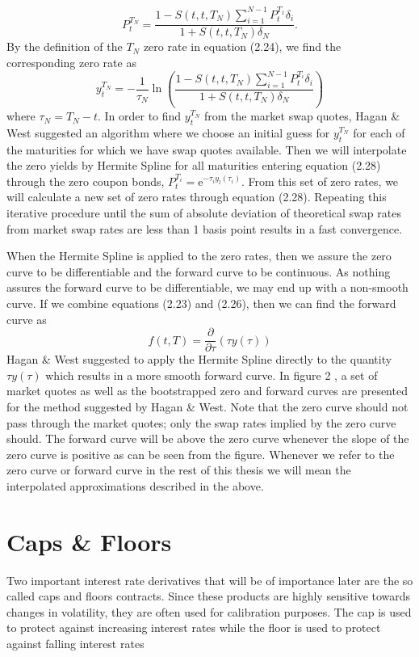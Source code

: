 \documentclass[12pt,twoside]{reedthesis}
\begin{document}
\[
P_{t}^{T_{N}}=\frac{1-S\left(t, t, T_{N}\right) \sum_{i=1}^{N-1} P_{t}^{T_{1}} \delta_{i}}{1+S\left(t, t, T_{N}\right) \delta_{N}} .
\]
By the definition of the \(T_{N}\) zero rate in equation (2.24), we find the corresponding zero rate as
\[
y_{t}^{T_{N}}=-\frac{1}{\tau_{N}} \ln \left(\frac{1-S\left(t, t, T_{N}\right) \sum_{i=1}^{N-1} P_{t}^{T_{i}} \delta_{i}}{1+S\left(t, t, T_{N}\right) \delta_{N}}\right)
\]
where \(\tau_{N}=T_{N}-t\). In order to find \(y_{t}^{T_{N}}\) from the market swap quotes, Hagan \& West suggested an algorithm where we choose an initial guess for \(y_{t}^{T_{N}}\) for each of the maturities for which we have swap quotes available. Then we will interpolate the zero yields by Hermite Spline for all maturities entering equation (2.28) through the zero coupon bonds, \(P_{t}^{T_{i}}=\mathrm{e}^{-\tau_{i} y_{l}\left(\tau_{i}\right)}\). From this set of zero rates, we will calculate a new set of zero rates through equation (2.28). Repeating this iterative procedure until the sum of absolute deviation of theoretical swap rates from market swap rates are less than 1 basis point results in a fast convergence.

When the Hermite Spline is applied to the zero rates, then we assure the zero curve to be differentiable and the forward curve to be continuous. As nothing assures the forward curve to be differentiable, we may end up with a non-smooth curve. If we combine equations (2.23) and (2.26), then we can find the forward curve as
\[
f(t, T)=\frac{\partial}{\partial \tau}(\tau y(\tau))
\]
Hagan \& West suggested to apply the Hermite Spline directly to the quantity \(\tau y(\tau)\) which results in a more smooth forward curve. In figure 2 , a set of market quotes as well as the bootstrapped zero and forward curves are presented for the method suggested by Hagan \& West. Note that the zero curve should not pass through the market quotes; only the swap rates implied by the zero curve should. The forward curve will be above the zero curve whenever the slope of the zero curve is positive as can be seen from the figure. Whenever we refer to the zero curve or forward curve in the rest of this thesis we will mean the interpolated approximations described in the above.

\hypertarget{caps-floors}{%
\section{Caps \& Floors}\label{caps-floors}}

Two important interest rate derivatives that will be of importance later are the so called caps and floors contracts. Since these products are highly sensitive towards changes in volatility, they are often used for calibration purposes. The cap is used to protect against increasing interest rates while the
floor is used to protect against falling interest rates
\end{document}
